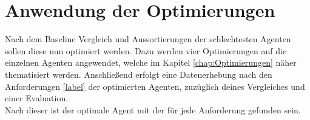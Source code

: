 \section{Anwendung der Optimierungen}
Nach dem Baseline Vergleich und Aussortierungen der schlechtesten Agenten sollen diese nun optimiert werden.
Dazu werden vier Optimierungen auf die einzelnen Agenten angewendet, welche im Kapitel \ref{chap:Optimierungen} näher thematisiert werden. 
Anschließend erfolgt eine Datenerhebung nach den Anforderungen \ref{label} der optimierten Agenten, zuzüglich deines Vergleiches und einer Evaluation.\\
Nach dieser ist der optimale Agent mit der für jede Anforderung gefunden sein.